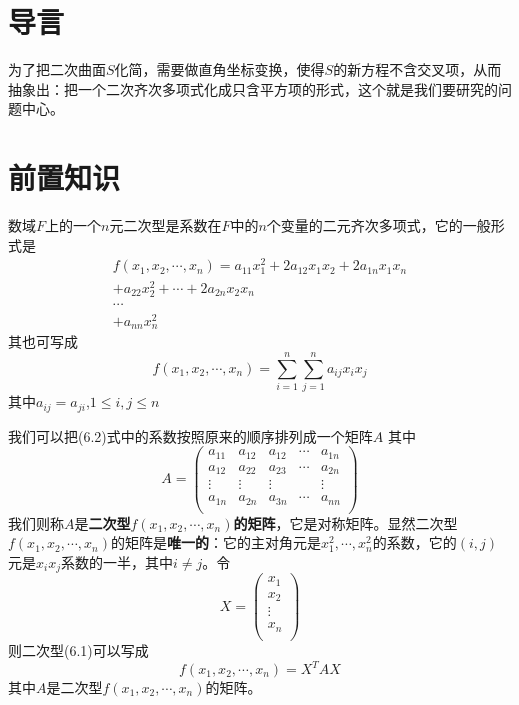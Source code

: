 \documentclass[lang=cn,10pt]{elegantbook}
\begin{document}
\section{导言}
为了把二次曲面$S$化简，需要做直角坐标变换，使得$S$的新方程不含交叉项，从而抽象出：把一个二次齐次多项式化成只含平方项的形式，这个就是我们要研究的问题中心。
\section{前置知识}
\begin{definition}
	数域$F$上的一个$n$元二次型是系数在$F$中的$n$个变量的二元齐次多项式，它的一般形式是
	\begin{equation}
		\begin{split}
			f(x_{1},x_{2},\cdots,x_{n})=a_{11}x^{2}_{1}+2a_{12}x_{1}x_{2}+2a_{1n}x_{1}x_{n}
			\\
			+a_{22}x^{2}_{2}+\cdots+2a_{2n}x_{2}x_{n}
			\\
			\cdots
			\\
			+a_{nn}x^{2}_{n}
		\end{split}
	\end{equation}
	其也可写成
	\begin{equation}
		f(x_{1},x_{2},\cdots,x_{n})=\sum_{i=1}^n{\sum_{j=1}^n{a_{ij}x_ix_j}}
	\end{equation}
	其中$a_{ij}=a_{ji}$,$1\le i,j\le n$
\end{definition}
我们可以把(6.2)式中的系数按照原来的顺序排列成一个矩阵$A$
其中
\begin{equation}
	A=\left( \begin{matrix}
	a_{11}&		a_{12}&		a_{12}&		\cdots&		a_{1n}\\
	a_{12}&		a_{22}&		a_{23}&		\cdots&		a_{2n}\\
	\vdots&		\vdots&		\vdots&		&		\vdots\\
	a_{1n}&		a_{2n}&		a_{3n}&		\cdots&		a_{nn}\\
	\end{matrix}\right) 
\end{equation}
我们则称$A$是\textbf{二次型}$f(x_{1},x_{2},\cdots,x_{n})$\textbf{的矩阵}，它是对称矩阵。显然二次型$f(x_{1},x_{2},\cdots,x_{n})$的矩阵是\textbf{唯一的}：它的主对角元是$x^{2}_{1},\cdots,x_{n}^{2}$的系数，它的$(i,j)$元是$x_{i}x_{j}$系数的一半，其中$i\ne j$。令
\begin{equation}
	X=\left( \begin{array}{c}
		x_1\\
		x_2\\
		\vdots\\
		x_n\\
	\end{array} \right) 
\end{equation}
则二次型(6.1)可以写成
\begin{equation}
	f(x_{1},x_{2},\cdots,x_{n})=X^{T}AX
\end{equation}
其中$A$是二次型$f(x_{1},x_{2},\cdots,x_{n})$的矩阵。
\end{document}
